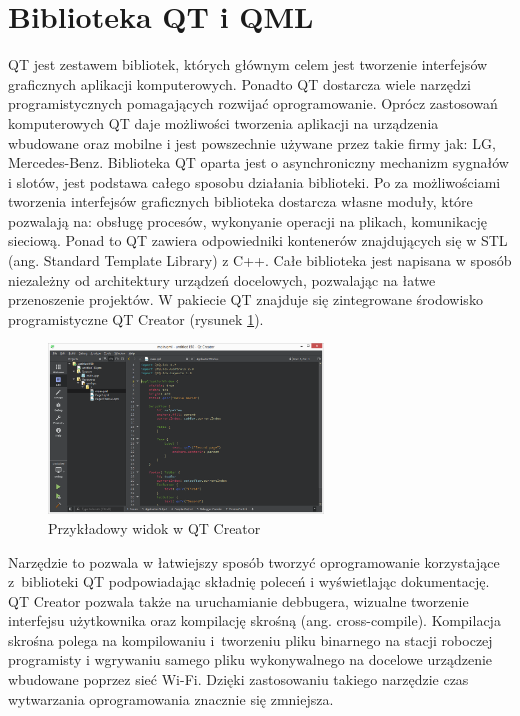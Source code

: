 \documentclass[12pt, eng, twoside, openany, final]{mgr}
\begin{document}
    \section{Biblioteka QT i QML}
    QT jest zestawem bibliotek, których głównym celem jest tworzenie interfejsów graficznych aplikacji komputerowych. Ponadto QT dostarcza wiele narzędzi programistycznych pomagających rozwijać oprogramowanie. Oprócz zastosowań komputerowych QT daje możliwości tworzenia aplikacji na urządzenia wbudowane oraz mobilne i jest powszechnie używane przez takie firmy jak: LG, Mercedes-Benz. Biblioteka QT oparta jest o asynchroniczny mechanizm sygnałów i slotów, jest podstawa całego sposobu działania biblioteki. Po za możliwościami tworzenia interfejsów graficznych biblioteka dostarcza własne moduły, które pozwalają na: obsługę procesów, wykonyanie operacji na plikach, komunikację sieciową. Ponad to QT zawiera odpowiedniki kontenerów znajdujących się w STL\cite{EffectiveModern} (ang. Standard Template Library) z C++. Całe biblioteka jest napisana w sposób niezależny od architektury urządzeń docelowych, pozwalając na łatwe przenoszenie projektów. W pakiecie QT znajduje się zintegrowane środowisko programistyczne QT Creator (rysunek \ref{fig:qtc}). 
        \begin{figure}[H]
        \begin{center}
            \includegraphics[width=0.65\textwidth]{qtc.png}
            \caption{Przykładowy widok w QT Creator }
            \label{fig:qtc}
        \end{center}
        \end{figure}
    \noindent Narzędzie to pozwala w łatwiejszy sposób tworzyć oprogramowanie korzystające z~biblioteki QT podpowiadając składnię poleceń i wyświetlając dokumentację. QT Creator pozwala także na uruchamianie debbugera\cite{debugger}, wizualne tworzenie interfejsu użytkownika oraz kompilację skrośną\cite{RpiBeginner} (ang. cross-compile). Kompilacja skrośna polega na kompilowaniu i~tworzeniu pliku binarnego na stacji roboczej programisty i wgrywaniu samego pliku wykonywalnego na docelowe urządzenie wbudowane poprzez sieć Wi-Fi. Dzięki zastosowaniu takiego narzędzie czas wytwarzania oprogramowania znacznie się zmniejsza. 
     
\end{document}
